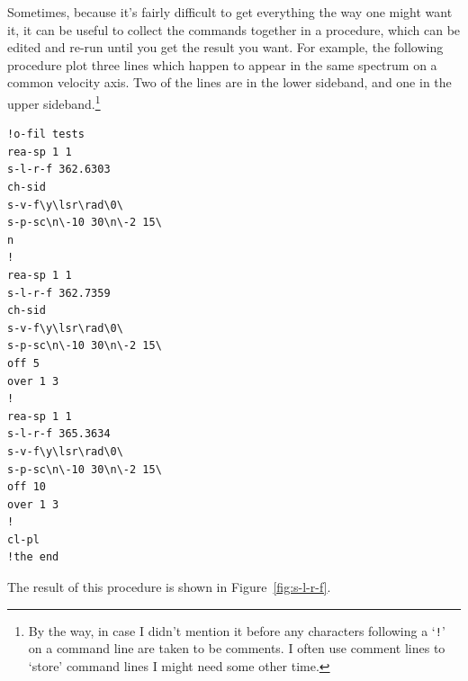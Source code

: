 \documentclass[11pt,twoside]{article}
\begin{document}
Sometimes, because it's fairly difficult to get everything the way one
might want it, it can be useful to collect the commands together in a
procedure, which can be edited and re-run until you get the result you
want. For example, the following procedure plot three lines which
happen to appear in the same spectrum on a common velocity axis. Two
of the lines are in the lower sideband, and one in the upper
sideband.\footnote{By the way, in case I didn't mention it before
any characters following a `{\tt{!}}' on a command line are taken to be
comments. I often use comment lines to `store' command lines I might need
some other time.} 

\begin{verbatim}
!o-fil tests
rea-sp 1 1
s-l-r-f 362.6303
ch-sid
s-v-f\y\lsr\rad\0\
s-p-sc\n\-10 30\n\-2 15\
n
!
rea-sp 1 1
s-l-r-f 362.7359
ch-sid
s-v-f\y\lsr\rad\0\
s-p-sc\n\-10 30\n\-2 15\
off 5
over 1 3
!
rea-sp 1 1
s-l-r-f 365.3634
s-v-f\y\lsr\rad\0\
s-p-sc\n\-10 30\n\-2 15\
off 10
over 1 3
!
cl-pl
!the end
\end{verbatim}

The result of this procedure is shown in Figure~\ref{fig:s-l-r-f}. 
\end{document}
